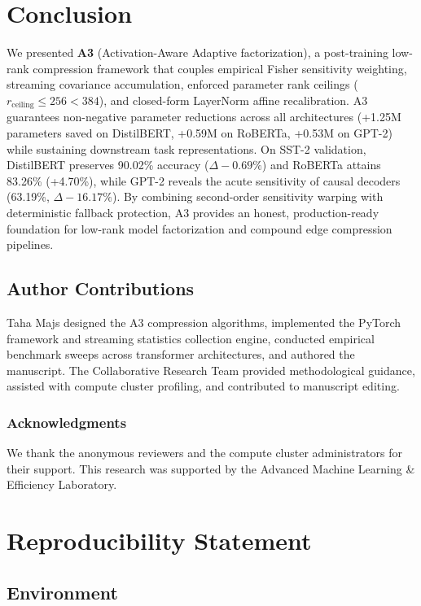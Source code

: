 \section{Conclusion}
\label{sec:conclusion}

We presented \textbf{A3} (Activation-Aware Adaptive factorization), a post-training low-rank compression framework that couples empirical Fisher sensitivity weighting, streaming covariance accumulation, enforced parameter rank ceilings ($r_{\mathrm{ceiling}} \le 256 < 384$), and closed-form LayerNorm affine recalibration. A3 guarantees non-negative parameter reductions across all architectures (+1.25M parameters saved on DistilBERT, +0.59M on RoBERTa, +0.53M on GPT-2) while sustaining downstream task representations. On SST-2 validation, DistilBERT preserves 90.02\% accuracy ($\Delta -0.69\%$) and RoBERTa attains 83.26\% (+4.70\%), while GPT-2 reveals the acute sensitivity of causal decoders (63.19\%, $\Delta -16.17\%$). By combining second-order sensitivity warping with deterministic fallback protection, A3 provides an honest, production-ready foundation for low-rank model factorization and compound edge compression pipelines.

\subsection{Author Contributions}
\label{sec:author_contributions}

Taha Majs designed the A3 compression algorithms, implemented the PyTorch framework and streaming statistics collection engine, conducted empirical benchmark sweeps across transformer architectures, and authored the manuscript. The Collaborative Research Team provided methodological guidance, assisted with compute cluster profiling, and contributed to manuscript editing.

\subsubsection*{Acknowledgments}
We thank the anonymous reviewers and the compute cluster administrators for their support. This research was supported by the Advanced Machine Learning \& Efficiency Laboratory.


\section{Reproducibility Statement}

\subsection{Environment}

